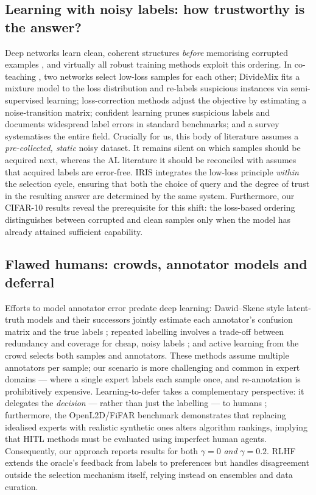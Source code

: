 \documentclass[a4paper,fleqn,longmktitle]{cas-sc}
\newcommand{\method}{IRIS}
\begin{document}
\subsection{Learning with noisy labels: how trustworthy is the answer?}
Deep networks learn clean, coherent structures \emph{before} memorising
corrupted examples \citep{zhang2017,arpit2017}, and virtually all
robust training methods exploit this ordering. In co-teaching
\citep{han2018}, two networks select low-loss samples for each other;
DivideMix \citep{li2020} fits a mixture model to the loss distribution
and re-labels suspicious instances via semi-supervised learning;
loss-correction methods \citep{patrini2017} adjust the objective by
estimating a noise-transition matrix; confident learning
\citep{northcutt2021} prunes suspicious labels and documents widespread
label errors in standard benchmarks; and a survey \citep{song2022}
systematises the entire field. Crucially for us, this body of
literature assumes a \emph{pre-collected, static} noisy dataset. It
remains silent on which samples should be acquired next, whereas the AL
literature it should be reconciled with assumes that acquired labels
are error-free. \method{} integrates the low-loss principle
\emph{within} the selection cycle, ensuring that both the choice of
query and the degree of trust in the resulting answer are determined by
the same system. Furthermore, our CIFAR-10 results reveal the
prerequisite for this shift: the loss-based ordering distinguishes
between corrupted and clean samples only when the model has already
attained sufficient capability.

\subsection{Flawed humans: crowds, annotator models and deferral}
Efforts to model annotator error predate deep learning: Dawid--Skene
style latent-truth models and their successors jointly estimate each
annotator's confusion matrix and the true labels \citep{raykar2010};
repeated labelling involves a trade-off between redundancy and coverage
for cheap, noisy labels \citep{sheng2008}; and active learning from the
crowd \citep{yan2011} selects both samples and annotators. These
methods assume multiple annotators per sample; our scenario is more
challenging and common in expert domains --- where a single expert
labels each sample once, and re-annotation is prohibitively expensive.
Learning-to-defer takes a complementary perspective: it delegates the
\emph{decision} --- rather than just the labelling --- to humans
\citep{madras2018,mozannar2020}; furthermore, the OpenL2D/FiFAR
benchmark \citep{alves2025} demonstrates that replacing idealised
experts with realistic synthetic ones alters algorithm rankings,
implying that HITL methods must be evaluated using imperfect human
agents. Consequently, our approach reports results for both
$\gamma{=}0$ \emph{and} $\gamma{=}0.2$. RLHF
\citep{ouyang2022,jiang2025} extends the oracle's feedback from labels
to preferences but handles disagreement outside the selection
mechanism itself, relying instead on ensembles and data curation.
\end{document}
